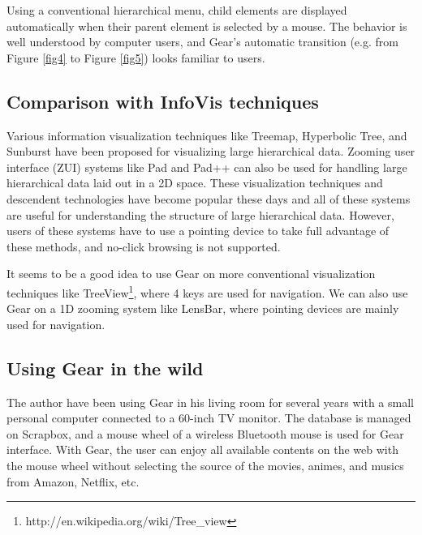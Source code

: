 \documentclass[conference]{IEEEtran}
\def\SB{Scrapbox}
\begin{document}
Using a conventional hierarchical menu,
child elements are displayed automatically when their parent element is selected by a mouse.
The behavior is well understood by computer users,
and Gear's automatic transition (e.g. from Figure \ref{fig4} to Figure \ref{fig5})
looks familiar to users.

\subsection{Comparison with InfoVis techniques}

Various information visualization techniques like
Treemap\cite{Johnson:1991:TSA:949607.949654},
Hyperbolic Tree\cite{Lamping:1995:FTB:223904.223956},
and Sunburst\cite{Stasko:2000:FDN:857190.857683}
have been proposed for visualizing large hierarchical data.
Zooming user interface (ZUI) systems like
Pad\cite{Perlin:1993:PAA:166117.166125} and
Pad++\cite{Bederson:1994:PZG:192426.192435}
can also be used for handling large hierarchical data laid out in a 2D space.
%
These visualization techniques and descendent technologies have become popular these days and
all of these systems are useful for understanding the structure of
large hierarchical data.
However, users of these systems have to use a pointing device
to take full advantage of these methods, and
no-click browsing is not supported.

It seems to be a good idea to use Gear on more conventional visualization techniques like
TreeView\footnote{
  \textsf{http://en.wikipedia.org/wiki/Tree\_view}
}, where 4 keys are used for navigation.
%
We can also use Gear on a 1D zooming system like
LensBar\cite{Masui:1998:LVB:647341.721215},
where pointing devices are mainly used for navigation.


\subsection{Using Gear in the wild}

The author have been using Gear in his living room for several years
with a small personal computer connected to a 60-inch TV monitor.
The database is managed on {\SB}, and
a mouse wheel of a wireless Bluetooth mouse is used for Gear interface.
With Gear, the user can enjoy all available contents on the web with the mouse wheel
without selecting the source of the movies, animes, and musics from Amazon, Netflix, etc.
\end{document}
